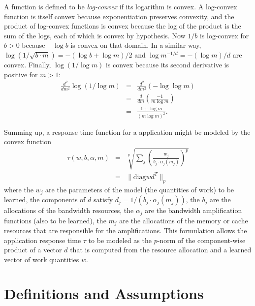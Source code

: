 A function is defined to be \emph{log-convex} if its logarithm is convex.
A log-convex function is itself convex because exponentiation preserves convexity,
and the product of log-convex functions is convex because the log of the product is the sum of the logs,
each of which is convex by hypothesis.
Now $1/b$ is log-convex for $b > 0$ because $-\log b$ is convex on that domain.
In a similar way, $\log(1/\sqrt{b\cdot m}) = -(\log b + \log m)/2$
and $\log m^{-1/d} = -(\log m)/d$ are convex.
Finally, $\log (1/\log m)$ is convex because its second derivative is positive for $m > 1$:
\begin{eqnarray*}
\frac{d^2}{dm^2}\log (1/\log m) &=& \frac{d^2}{dm^2}(-\log\log m)  \\
                                  &=& \frac{d}{dm}\left(\frac{-1}{m\log m}\right) \\
                                  &=& \frac{1 + \log m}{(m\log m)^2}.
\end{eqnarray*}

Summing up, a response time function for a application might be modeled by the convex function
\begin{eqnarray*}
\tau(w,b,\alpha,m) &=& \sqrt[p]{\sum_j \left(\frac{w_j}{b_j\cdot\alpha_j(m_j)}\right)^p}  \\
                   &=& \|\mbox{diag} wd^T \|_p
\end{eqnarray*}
where the $w_j$ are the parameters of the model (the quantities of work) to be learned,
the components of $d$ satisfy $d_j = 1/(b_j\cdot\alpha_j(m_j))$,
the $b_j$  are the allocations of the bandwidth resources,
the $\alpha_j$ are the bandwidth amplification functions (also to be learned),
the $m_j$ are the allocations of the memory or cache resources that are responsible for the amplifications.
This formulation allows the application response time $\tau$ to be modeled as the $p$-norm of
the component-wise product of a vector $d$ that is computed from the resource allocation
and a learned vector of work quantities $w$.


\section{Definitions and Assumptions}

